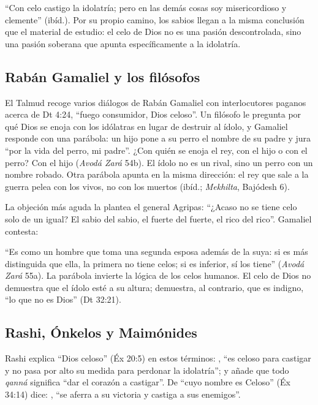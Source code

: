 
``Con celo castigo la idolatría; pero en las demás cosas soy misericordioso y clemente'' (ibíd.). Por su propio camino, los sabios llegan a la misma conclusión que el material de estudio: el celo de Dios no es una pasión descontrolada, sino una pasión soberana que apunta específicamente a la idolatría.

\subsection{Rabán Gamaliel y los filósofos}
El Talmud recoge varios diálogos de Rabán Gamaliel con interlocutores paganos acerca de Dt 4:24, ``fuego consumidor, Dios celoso''. Un filósofo le pregunta por qué Dios se enoja con los idólatras en lugar de destruir al ídolo, y Gamaliel responde con una parábola: un hijo pone a su perro el nombre de su padre y jura ``por la vida del perro, mi padre''. ¿Con quién se enoja el rey, con el hijo o con el perro? Con el hijo (\emph{Avodá Zará} 54b). El ídolo no es un rival, sino un perro con un nombre robado. Otra parábola apunta en la misma dirección: el rey que sale a la guerra pelea con los vivos, no con los muertos (ibíd.; \emph{Mekhilta}, Bajódesh 6).

La objeción más aguda la plantea el general Agripas: ``¿Acaso no se tiene celo solo de un igual? El sabio del sabio, el fuerte del fuerte, el rico del rico''. Gamaliel contesta:


``Es como un hombre que toma una segunda esposa además de la suya: si es más distinguida que ella, la primera no tiene celos; si es inferior, sí los tiene'' (\emph{Avodá Zará} 55a). La parábola invierte la lógica de los celos humanos. El celo de Dios no demuestra que el ídolo esté a su altura; demuestra, al contrario, que es indigno, ``lo que no es Dios'' (Dt 32:21).

\subsection{Rashi, Ónkelos y Maimónides}
Rashi explica ``Dios celoso'' (Éx 20:5) en estos términos: , ``es celoso para castigar y no pasa por alto su medida para perdonar la idolatría''; y añade que todo \emph{qanná} significa ``dar el corazón a castigar''. De ``cuyo nombre es Celoso'' (Éx 34:14) dice: , ``se aferra a su victoria y castiga a sus enemigos''.

